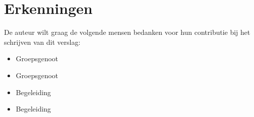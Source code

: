 \documentclass[10pt]{article}
\title{\titlecap{\scshape Project Robotica}\normalfont}
\author{Wessel Tip $<$contact@wessel.gg$>$ (\url{https://wessel.gg/}) \\
Technische Informatica \\
Hoogeschool Inholland Alkmaar \\
 Jaar 2, Semester 2 (Jan. 2024 - Jun. 2024)
}
\begin{document}
\maketitle

\begin{abstract}
In dit verslag zal besproken worden waarom er is gekozen om een RESTful API
te maken voor het project Robotica.

De toegankelijkheid en schaalbaarheid van de API-architecturen REST, SOAP,
GraphQL en gRPC zullen worden vergeleken om uiteindelijk op de conclusie te
komen waarom REST gebruikt word.
\end{abstract}

\tableofcontents







\section*{Erkenningen}
\label{sec:erkenningen}
De auteur wilt graag de volgende mensen bedanken voor hun contributie bij het schrijven van dit verslag:
\begin{itemize}
  \item[]  Groepsgenoot
  \item[]  Groepsgenoot
  \item[]  Begeleiding
  \item[]  Begeleiding
\end{itemize}

\label{sec:referenties}


\end{document}
